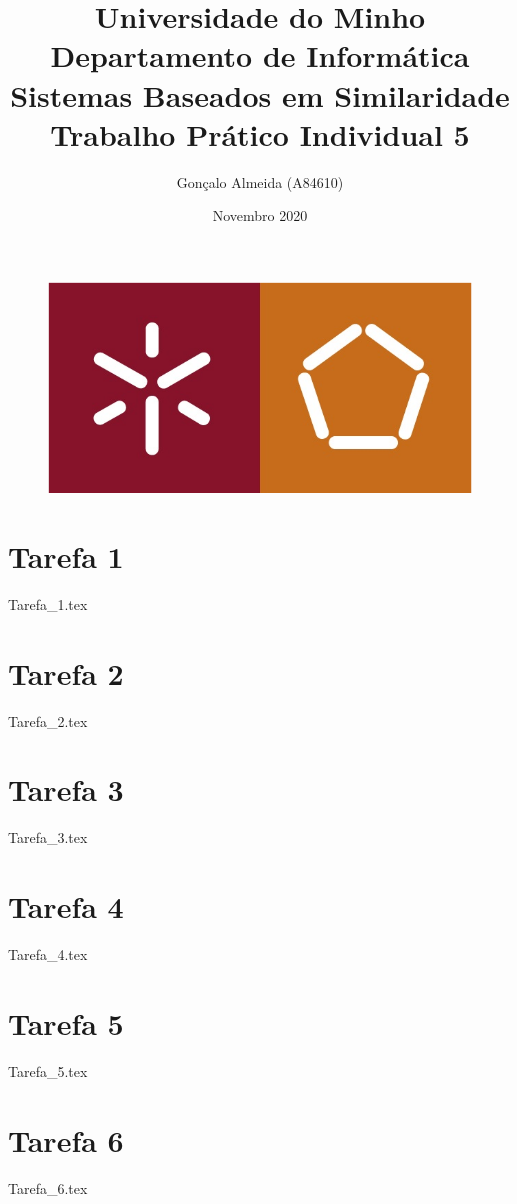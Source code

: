 \documentclass{article}
\title{
    \textbf{
        Universidade do Minho \\
        Departamento de Informática \\
        \vspace{1.5cm}
        Sistemas Baseados em Similaridade \\
        \vspace{1cm}
        Trabalho Prático Individual 5}
        \vspace{2cm}}
\author{Gonçalo Almeida (A84610)
        \vspace{3cm}}
\date{Novembro 2020}
\begin{document}
\begin{figure}[t]
    \centering
    \includegraphics[scale=0.4]{Images/MIEI_logo.png}
\end{figure}

\maketitle

\clearpage

\section{Tarefa 1}

{Tarefa_1.tex}

\clearpage

\section{Tarefa 2}

{Tarefa_2.tex}

\clearpage

\section{Tarefa 3}

{Tarefa_3.tex}

\clearpage

\section{Tarefa 4}

{Tarefa_4.tex}

\clearpage

\section{Tarefa 5}

{Tarefa_5.tex}

\clearpage

\section{Tarefa 6}

{Tarefa_6.tex}

\clearpage
\end{document}
